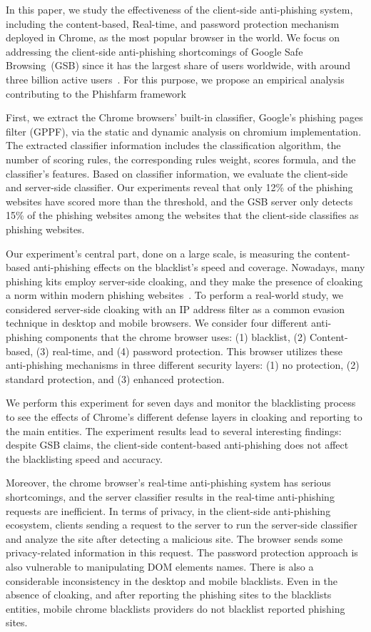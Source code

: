 In this paper, we study the effectiveness of the client-side anti-phishing system, including the content-based, Real-time, and password protection mechanism deployed in Chrome, as the most popular browser in the world. We focus on addressing the client-side anti-phishing shortcomings of Google Safe Browsing~(GSB) since it has the largest share of users worldwide, with around three billion active users~\cite{statcounterall}.
For this purpose, we propose an empirical analysis contributing to the Phishfarm framework~\cite{oest2019phishfarm}
 
First, we extract the Chrome browsers' built-in classifier, Google's phishing pages filter (GPPF), via the static and dynamic analysis on chromium implementation. 
The extracted classifier information includes the classification algorithm, the number of scoring rules, the corresponding rules weight, scores formula, and the classifier's features. 
Based on classifier information, we evaluate the client-side and server-side classifier. Our experiments reveal that only 12\%  of the phishing websites have scored more than the threshold, and the GSB server only detects 15\%  of the phishing websites among the websites that the client-side classifies as phishing websites. 

Our experiment's central part, done on a large scale, is measuring the content-based anti-phishing effects on the blacklist's speed and coverage.
Nowadays, many phishing kits employ server-side cloaking, and they make the presence of cloaking a  norm within modern phishing websites~\cite{oest2018inside}.
To perform a real-world study, we considered server-side cloaking with an IP address filter as a common evasion technique in desktop and mobile browsers.
We consider four different anti-phishing components that the chrome browser uses: (1) blacklist, (2) Content-based, (3) real-time, and (4) password protection. This browser utilizes these anti-phishing mechanisms in three different security layers: (1) no protection, (2) standard protection, and (3) enhanced protection.

We perform this experiment for seven days and monitor the blacklisting process to see the effects of Chrome's different defense layers in cloaking and reporting to the main entities.
The experiment results lead to several interesting findings: 
despite GSB claims, the client-side content-based anti-phishing does not affect the blacklisting speed and accuracy.

Moreover, the chrome browser's real-time anti-phishing system has serious shortcomings, and the server classifier results in the real-time anti-phishing requests are inefficient. 
In terms of privacy, in the client-side anti-phishing ecosystem, clients sending a request to the server to run the server-side classifier and analyze the site after detecting a malicious site. The browser sends some privacy-related information in this request.
The password protection approach is also vulnerable to manipulating DOM elements names. 
There is also a considerable inconsistency in the desktop and mobile blacklists. Even in the absence of cloaking, and after reporting the phishing sites to the blacklists entities, mobile chrome blacklists providers do not blacklist reported phishing sites.

